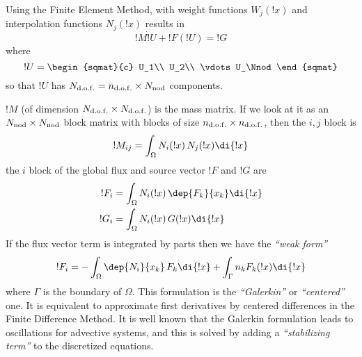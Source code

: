 
Using the Finite Element Method, with weight functions $W_j(!x)$ and
interpolation functions $N_j(!x)$ results in
%
\begin{equation} 
   !M \dot !U + !F(!U) = !G
\end{equation}
%
where 
%
\begin{equation} 
  !U = \begin{sqmat}{c}
        U_1\\
        U_2\\
        \vdots
        U_\Nnod
       \end{sqmat}
\end{equation}
%
so that $!U$ has ${N_{\mathrm{d.o.f.}}}={n_{\mathrm{d.o.f.}}}\times{N_{\mathrm{nod}}}$ components. 

$!M$ (of dimension ${N_{\mathrm{d.o.f.}}}\times{N_{\mathrm{d.o.f.}}}$) is the mass matrix. If we look
at it as an ${N_{\mathrm{nod}}}\times{N_{\mathrm{nod}}}$ block matrix with blocks of
size ${n_{\mathrm{d.o.f.}}}\times{n_{\mathrm{d.o.f.}}}$, then the $i,j$ block is
%
\begin{equation}
   !M_{ij} = \int_\Omega N_i(!x) \, N_j(!x) \di{!x}
\end{equation}
%
the $i$ block of the global flux and source vector $!F$ and $!G$ are 
%
\begin{align}
   !F_{i} &= \int_\Omega N_i(!x) \, \dep{F_k}{x_k} \di{!x}\\
   !G_{i} &= \int_\Omega N_i(!x) \, G(!x) \di{!x}
\end{align}
%
If the flux vector term is integrated by parts then we have the
\emph{``weak form''}
%
\begin{equation}
   !F_{i} = -\int_\Omega \dep{N_i}{x_k} \, F_k \di{!x} + \int_\Gamma
   n_k F_k(!x) \di{!x}
\end{equation}
%
%
where $\Gamma$ is the boundary of $\Omega$. This formulation is the
\emph{``Galerkin''} or \emph{``centered''} one. It is equivalent to
approximate first derivatives by centered differences in the Finite
Difference Method. It is well known that the Galerkin formulation
leads to oscillations for advective systems, and this is solved by
adding a \emph{``stabilizing term''} to the discretized equations. 


